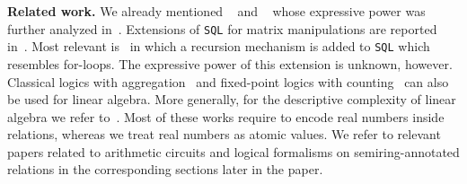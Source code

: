 %


\smallskip
\noindent
\textbf{Related work.} 
We already mentioned \lara~\cite{HutchisonHS17} and \lang~\cite{matlang,matlang-journal}
whose expressive power was further analyzed in~\cite{BarceloH0S20,brijder2019matrices,Geerts19,Geerts20}.
Extensions of \texttt{SQL} for matrix manipulations are reported in~\cite{Jermaine/17/LAonRA}. Most relevant
is~\cite{JankovLYCZJG19} in which a recursion mechanism is added to \texttt{SQL} which resembles for-loops.
The expressive power of this extension is unknown, however. Classical logics with aggregation~\cite{Hella:2001} and fixed-point logics with counting~\cite{GroheP17} can also be used for linear algebra. More generally, for the descriptive complexity of linear algebra we refer to~\cite{dghl_rank,holm_phd}. Most of these works require to encode real numbers inside relations, whereas we treat real numbers as atomic values. We refer to relevant papers related to arithmetic circuits and logical formalisms on semiring-annotated relations in the corresponding sections later in the paper.


